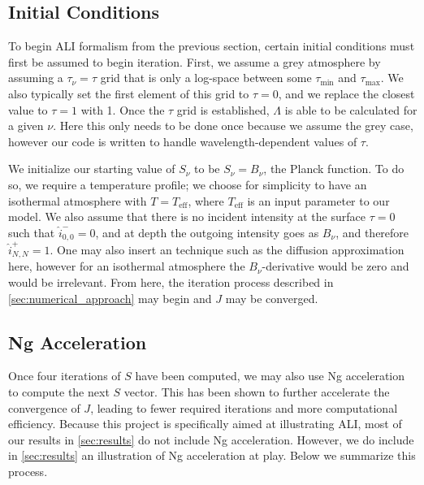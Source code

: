 \documentclass[12pt]{article}
\begin{document}
\subsection{Initial Conditions}


To begin ALI formalism from the previous section, certain initial conditions must first be assumed to begin iteration. First, we assume a grey atmosphere by assuming a $\tau_\nu = \tau$ grid that is only a log-space between some $\tau_\text{min}$ and $\tau_\text{max}$. We also typically set the first element of this grid to $\tau = 0$, and we replace the closest value to $\tau = 1$ with 1. Once the $\tau$ grid is established, $\Lambda$ is able to be calculated for a given $\nu$. Here this only needs to be done once because we assume the grey case, however our code is written to handle wavelength-dependent values of $\tau$.

We initialize our starting value of $S_\nu$ to be $S_\nu = B_\nu$, the Planck function. To do so, we require a temperature profile; we choose for simplicity to have an isothermal atmosphere with $T = T_\text{eff}$, where $T_\text{eff}$ is an input parameter to our model. We also assume that there is no incident intensity at the surface $\tau = 0$ such that $\hat{i}^-_{0, 0} = 0$, and at depth the outgoing intensity goes as $B_\nu$, and therefore $\hat{i}^+_{N, N} = 1$. One may also insert an technique such as the diffusion approximation here, however for an isothermal atmosphere the $B_\nu$-derivative would be zero and would be irrelevant. From here, the iteration process described in \autoref{sec:numerical_approach} may begin and $J$ may be converged.


\subsection{Ng Acceleration}
\label{sec:ng}


Once four iterations of $S$ have been computed, we may also use Ng acceleration \citep{ng_1974} to compute the next $S$ vector. This has been shown to further accelerate the convergence of $J$, leading to fewer required iterations and more computational efficiency. Because this project is specifically aimed at illustrating ALI, most of our results in \autoref{sec:results} do not include Ng acceleration. However, we do include in \autoref{sec:results} an illustration of Ng acceleration at play. Below we summarize this process.
\end{document}
